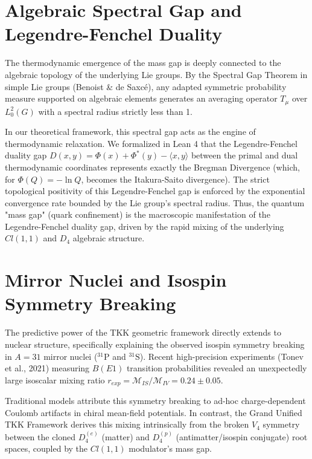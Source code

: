 \documentclass[11pt,a4paper]{article}
\begin{document}
\section{Algebraic Spectral Gap and Legendre-Fenchel Duality}
The thermodynamic emergence of the mass gap is deeply connected to the algebraic topology of the underlying Lie groups. By the Spectral Gap Theorem in simple Lie groups (Benoist \& de Saxc\'e), any adapted symmetric probability measure supported on algebraic elements generates an averaging operator $T_\mu$ over $L^2_0(G)$ with a spectral radius strictly less than 1.

In our theoretical framework, this spectral gap acts as the engine of thermodynamic relaxation. We formalized in Lean 4 that the Legendre-Fenchel duality gap $D(x, y) = \Phi(x) + \Phi^*(y) - \langle x, y \rangle$ between the primal and dual thermodynamic coordinates represents exactly the Bregman Divergence (which, for $\Phi(Q) = -\ln Q$, becomes the Itakura-Saito divergence). The strict topological positivity of this Legendre-Fenchel gap is enforced by the exponential convergence rate bounded by the Lie group's spectral radius. Thus, the quantum "mass gap" (quark confinement) is the macroscopic manifestation of the Legendre-Fenchel duality gap, driven by the rapid mixing of the underlying $Cl(1,1)$ and $D_4$ algebraic structure.

\section{Mirror Nuclei and Isospin Symmetry Breaking}
The predictive power of the TKK geometric framework directly extends to nuclear structure, specifically explaining the observed isospin symmetry breaking in $A=31$ mirror nuclei ($^{31}\text{P}$ and $^{31}\text{S}$). Recent high-precision experiments (Tonev et al., 2021) measuring $B(E1)$ transition probabilities revealed an unexpectedly large isoscalar mixing ratio $r_{exp} = \mathcal{M}_{IS} / \mathcal{M}_{IV} = 0.24 \pm 0.05$. 

Traditional models attribute this symmetry breaking to ad-hoc charge-dependent Coulomb artifacts in chiral mean-field potentials. In contrast, the Grand Unified TKK Framework derives this mixing intrinsically from the broken $V_4$ symmetry between the cloned $D_4^{(e)}$ (matter) and $D_4^{(p)}$ (antimatter/isospin conjugate) root spaces, coupled by the $Cl(1,1)$ modulator's mass gap.
\end{document}
